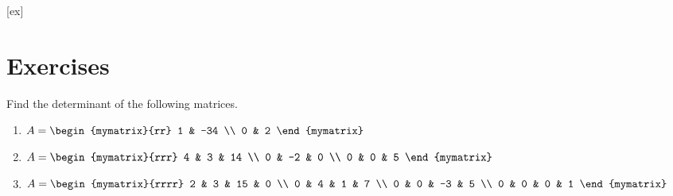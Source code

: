 [ex]
\section*{Exercises}

\begin{enumialphparenastyle}

\begin{ex} Find the determinant of the following matrices.

\begin{enumerate}
\item 
$A = \begin{mymatrix}{rr}
1 & -34 \\
0 & 2 
\end{mymatrix} $

\item 
$A = \begin{mymatrix}{rrr}
4 & 3 & 14 \\
 0 & -2 & 0 \\
0 & 0 & 5 
\end{mymatrix}$

\item 
$A = \begin{mymatrix}{rrrr}
2 & 3 & 15 & 0 \\
0 & 4 & 1 & 7 \\
0 & 0 & -3 & 5 \\
0 & 0 & 0 & 1 
\end{mymatrix}$
\end{enumerate}


\end{ex}

\end{enumialphparenastyle}
